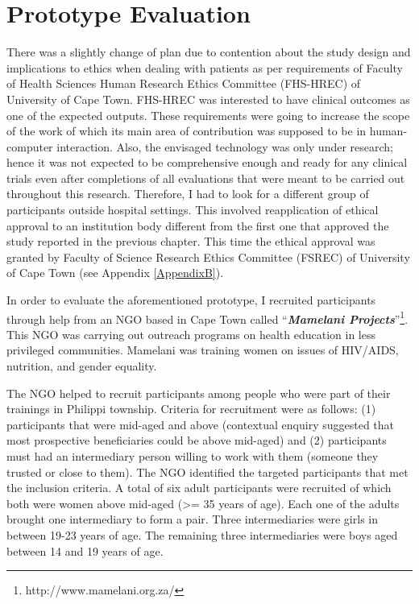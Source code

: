 \section{Prototype Evaluation}
There was a slightly change of plan  due to contention about the study design and implications to ethics when dealing with patients as per requirements of Faculty of Health Sciences Human Research Ethics Committee (FHS-HREC) of University of Cape Town. FHS-HREC was interested to have clinical outcomes as one of the expected outputs. These requirements were going to increase the scope of the work of which its main area of contribution was supposed to be in human-computer interaction. Also, the envisaged technology was only under research; hence it was not expected to be comprehensive enough and ready for any clinical trials even after completions of all evaluations that were meant to be carried out throughout this research. Therefore, I had to look for a different group of participants outside hospital settings. This involved reapplication of ethical approval to an institution body different from the first one that approved the study reported in the previous chapter. This time the ethical approval was granted by Faculty of Science Research Ethics Committee (FSREC) of University of Cape Town (see Appendix \ref{AppendixB}).

In order to evaluate the aforementioned prototype, I recruited participants through help from an NGO
based in Cape Town called ``\textbf{\textit{Mamelani Projects}}''\footnote{http://www.mamelani.org.za/}. This NGO was carrying out outreach programs on health education in less privileged
communities. Mamelani was training women on issues of HIV/AIDS, nutrition, and gender equality. 

The NGO helped to recruit participants among people who were part of their trainings in Philippi township. Criteria for recruitment were as follows: (1) participants that were mid-aged and above (contextual enquiry suggested that most prospective beneficiaries could be above mid-aged) and (2) participants must had an intermediary person willing to work with them (someone they trusted or close to them). The NGO identified the targeted participants that met the inclusion criteria. A total of six adult participants were recruited of which both were women above mid-aged (\textgreater= 35 years of age). Each one of the adults brought one intermediary to form a pair. Three intermediaries were girls in between 19-23 years of age. The remaining three intermediaries were boys aged between 14 and 19 years of age. 

